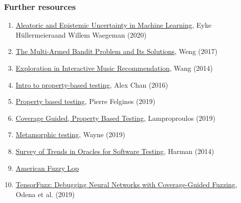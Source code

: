 \documentclass{beamer}
\begin{document}
\begin{frame}
\frametitle{Further resources}
\begin{enumerate}
\item \href{https://arxiv.org/pdf/1910.09457.pdf}{Aleatoric and Epistemic Uncertainty in Machine Learning}, Eyke H\"ullermeieraand Willem Waegeman (2020)
\item \href{https://lilianweng.github.io/lil-log/2018/01/23/the-multi-armed-bandit-problem-and-its-solutions.html#thompson-sampling}{The Multi-Armed Bandit Problem and Its Solutions}, Weng (2017)
\item \href{https://dl.acm.org/doi/pdf/10.1145/2623372}{Exploration in Interactive Music Recommendation}, Wang (2014)
\item \href{https://alexwlchan.net/2016/06/hypothesis-intro/}{Intro to property-based testing}, Alex Chan (2016)
\item \href{https://felginep.github.io/2019-03-20/property-based-testing}{Property based testing}, Pierre Felgines (2019)
\item \href{https://lemonidas.github.io/pdf/FuzzChick.pdf}{Coverage Guided, Property Based Testing}, Lamproproulos (2019)
\item \href{https://www.hillelwayne.com/post/metamorphic-testing/}{Metamorphic testing}, Wayne (2019)
\item \href{https://mcminn.io/publications/tr3.pdf}{Survey of Trends in Oracles for Software Testing}, Harman (2014)
\item \href{https://lcamtuf.coredump.cx/afl/}{American Fuzzy Lop}
\item \href{http://proceedings.mlr.press/v97/odena19a/odena19a.pdf}{TensorFuzz: Debugging Neural Networks with Coverage-Guided Fuzzing}, Odena et al. (2019)
\end{enumerate}
\end{frame}
\end{document}
